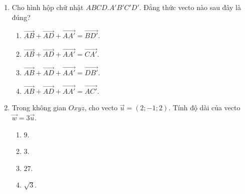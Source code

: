 \documentclass[12pt]{article}
\begin{document}
\begin{enumerate}[label=\textbf{Câu \arabic*.}, leftmargin=*]
\begin{center}
		\end{center}
		Giá trị lớn nhất của hàm số $y = f(x)$ trên đoạn $[-2; 3]$ bằng:
		\begin{multicols}{4}
			\begin{enumerate}[label=\Alph*.]
				\item $3$.
				\item $-2$.
				\item $4$.
				\item $1$.
			\end{enumerate}
		\end{multicols}
		
		\item Cho hình hộp chữ nhật $ABCD.A'B'C'D'$. Đẳng thức vecto nào sau đây là đúng?
		\begin{multicols}{2}
			\begin{enumerate}[label=\Alph*.]
				\item $\overrightarrow{AB} + \overrightarrow{AD} + \overrightarrow{AA'} = \overrightarrow{BD'}$.
				\item $\overrightarrow{AB} + \overrightarrow{AD} + \overrightarrow{AA'} = \overrightarrow{CA'}$.
				\item $\overrightarrow{AB} + \overrightarrow{AD} + \overrightarrow{AA'} = \overrightarrow{DB'}$.
				\item $\overrightarrow{AB} + \overrightarrow{AD} + \overrightarrow{AA'} = \overrightarrow{AC'}$.
			\end{enumerate}
		\end{multicols}
		
		\item Trong không gian $Oxyz$, cho vecto $\vec{u} = (2; -1; 2)$. Tính độ dài của vecto $\vec{w} = 3\vec{u}$.
		\begin{multicols}{4}
			\begin{enumerate}[label=\Alph*.]
				\item $9$.
				\item $3$.
				\item $27$.
				\item $\sqrt{3}$.
			\end{enumerate}
		\end{multicols}
	\end{enumerate}
	
\end{document}
